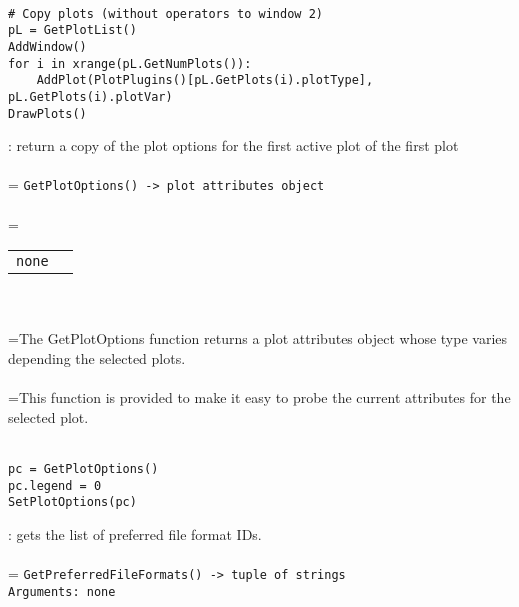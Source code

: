 \documentclass[10pt,a4paper]{report}
\begin{document}
\\[-6mm]
\begin{verbatim}# Copy plots (without operators to window 2)
pL = GetPlotList()
AddWindow()
for i in xrange(pL.GetNumPlots()):
    AddPlot(PlotPlugins()[pL.GetPlots(i).plotType], pL.GetPlots(i).plotVar)
DrawPlots()
\end{verbatim}
\newpage


{}
: return a copy of the plot options for the first active plot of the first plot\\[-3mm]

 \\ 
\hangindent=\parindent 
\verb!GetPlotOptions() -> plot attributes object!\\ [-3mm]

 \\ 
\hangindent=\parindent 
\begin{tabular}{ll}
\verb!none! &  \\
\end{tabular} \\[-2mm]


 \\ 
\hangindent=\parindent The GetPlotOptions function returns a plot attributes object whose type varies depending the selected plots. \\[-3mm] 

 \\ 
\hangindent=\parindent This function is provided to make it easy to probe the current attributes for the selected plot. \\[-3mm] 

\\[-6mm]
\begin{verbatim}pc = GetPlotOptions()
pc.legend = 0
SetPlotOptions(pc)
\end{verbatim}
\newpage


{}
: gets the list of preferred file format IDs.\\[-3mm]

 \\ 
\hangindent=\parindent 
\verb!GetPreferredFileFormats() -> tuple of strings!\\ 
\verb!Arguments: none!\\ [-3mm]
\end{document}
